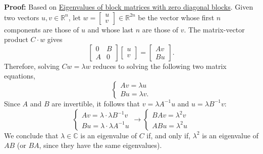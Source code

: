 \textbf{Proof:} Based on \href{https://math.stackexchange.com/questions/262563/eigenvalues-of-block-matrices-with-zero-diagonal-blocks}{Eigenvalues of block matrices with zero diagonal blocks}. Given two vectors \( u, v \in \mathbb{R}^n \), let \( w = \begin{bmatrix} u \\ v \end{bmatrix} \in \mathbb{R}^{2n} \) be the vector whose first \( n \) components are those of \( u \) and whose last \( n \) are those of \( v \). The matrix-vector product \( C \cdot w \) gives
\[ \begin{bmatrix} 0 & B \\ A & 0 \end{bmatrix} \begin{bmatrix} u \\ v \end{bmatrix} = \begin{bmatrix} Av \\ Bu \end{bmatrix}. \]
Therefore, solving \( Cw = \lambda w \) reduces to solving the following two matrix equations,
\[ \begin{cases} Av = \lambda u \\ Bu = \lambda v. \end{cases} \]
Since \( A \) and \( B \) are invertible, it follows that \( v = \lambda A^{-1}u \) and \( u = \lambda B^{-1}v \):
\[ \begin{cases} Av = \lambda \cdot \lambda B^{-1}v \\ Bu = \lambda \cdot \lambda A^{-1}u \end{cases} \rightarrow \begin{cases} BAv = \lambda^2 v \\ ABu = \lambda^2 u \end{cases} \]
We conclude that \( \lambda \in \mathbb{C} \) is an eigenvalue of \( C \) if, and only if, \( \lambda^2 \) is an eigenvalue of \( AB \) (or \( BA \), since they have the same eigenvalues).

\Qed






